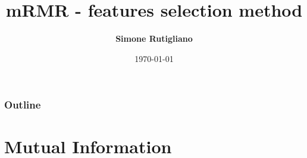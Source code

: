 \documentclass{beamer}
\title[mRMR]{mRMR - features selection method}
\institute{
\begin{small}
Corso di Laurea in Informatica Magistrale
\end{small}}
\author{\textbf{Simone Rutigliano}}
\date{\tiny{\today}}
\begin{document}

\begin{frame}
\maketitle
\end{frame}


\begin{frame}
\frametitle{Outline}
	\begin{multicols}{2}
		\tableofcontents
	\end{multicols}
\end{frame}

\section{Mutual Information}
\end{document}
